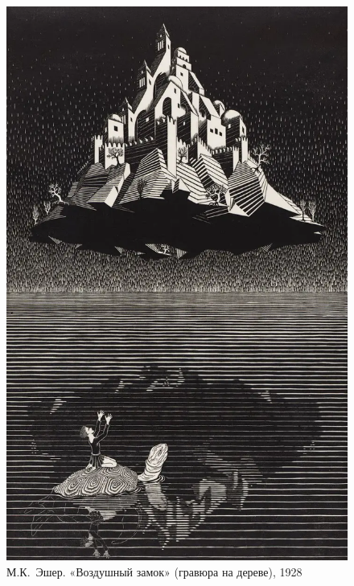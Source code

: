 \documentclass[../main.tex]{subfiles}
\begin{document}
\begin{figure}
    \centering
    \includegraphics[max width=\textwidth, max totalheight=\textheight-2\baselineskip]{img/escher-castle-in-the-air.png}
    \caption{М.К.~Эшер. «Воздушный замок» (гравюра на дереве), 1928}
    \label{fig:escher-castle}
\end{figure}
\end{document}
